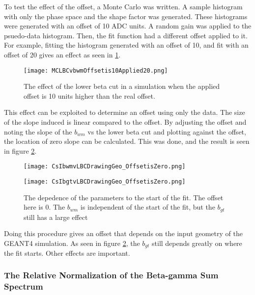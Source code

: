 \documentclass[main.tex]{subfiles}
\begin{document}
To test the effect of the offset, a Monte Carlo was written.
A sample histogram with only the phase space and the shape factor was generated. 
These histograms were generated with an offset of 10 ADC units.
A random gain was applied to the psuedo-data histogram. 
Then, the fit function had a different offset applied to it.
For example, fitting the histogram generated with an offset of 10, and fit with an offset of 20 gives an effect as seen in \ref{fig:MCoffset10applied20}.

\begin{figure}
	\centerline{\texttt{[image: MCLBCvbwmOffsetis10Applied20.png]}}
	\caption{The effect of the lower beta cut in a simulation when the applied offset is 10 units higher than the real offset.}
	\label{fig:MCoffset10applied20}
\end{figure}

This effect can be exploited to determine an offset using only the data. 
The size of the slope induced is linear compared to the offset.
By adjusting the offset and noting the slope of the $b_{wm}$ vs the lower beta cut and plotting against the offset, the location of zero slope can be calculated.
This was done, and the result is seen in figure \ref{fig:offset0LBCeffect}.

\begin{figure}
    \centering
    \begin{minipage}{0.50\textwidth}
        \centerline{\texttt{[image: CsIbwmvLBCDrawingGeo\_OffsetisZero.png]}}
    \end{minipage}\hfill
    \begin{minipage}{0.50\textwidth}
        \centerline{\texttt{[image: CsIbgtvLBCDrawingGeo\_OffsetisZero.png]}}
    \end{minipage}
    \caption{The depedence of the parameters to the start of the fit.
	     The offset here is 0.
	     The $b_{wm}$ is independent of the start of the fit, but the $b_{gt}$ still has a large effect}
    \label{fig:offset0LBCeffect}
\end{figure}


Doing this procedure gives an offset that depends on the input geometry of the GEANT4 simulation.
As seen in figure \ref{fig:offset0LBCeffect}, the $b_{gt}$ still depends greatly on where the fit starts.
Other effects are important. 

\subsubsection{The Relative Normalization of the Beta-gamma Sum Spectrum}
\end{document}
